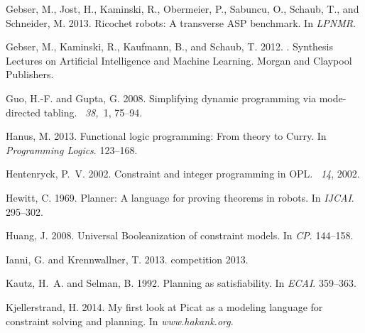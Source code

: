 \documentclass{new_tlp}
\begin{document}
\begin{thebibliography}{}
{\sc Gebser, M.}, {\sc Jost, H.}, {\sc Kaminski, R.}, {\sc Obermeier, P.}, {\sc
  Sabuncu, O.}, {\sc Schaub, T.}, {\sc and} {\sc Schneider, M.} 2013.
\newblock Ricochet robots: A transverse {ASP} benchmark.
\newblock In {\em LPNMR}.

{\sc Gebser, M.}, {\sc Kaminski, R.}, {\sc Kaufmann, B.}, {\sc and} {\sc
  Schaub, T.} 2012.
.
\newblock Synthesis Lectures on Artificial Intelligence and Machine Learning.
  Morgan and Claypool Publishers.

{\sc Guo, H.-F.} {\sc and} {\sc Gupta, G.} 2008.
\newblock Simplifying dynamic programming via mode-directed tabling.
~{\em 38,\/}~1, 75--94.

{\sc Hanus, M.} 2013.
\newblock Functional logic programming: From theory to {Curry}.
\newblock In {\em Programming Logics}. 123--168.

{\sc Hentenryck, P.~V.} 2002.
\newblock Constraint and integer programming in {OPL}.
~{\em 14}, 2002.

{\sc Hewitt, C.} 1969.
\newblock Planner: A language for proving theorems in robots.
\newblock In {\em IJCAI}. 295--302.

{\sc Huang, J.} 2008.
\newblock Universal {Booleanization} of constraint models.
\newblock In {\em CP}. 144--158.

{\sc Ianni, G.} {\sc and} {\sc Krennwallner, T.} 2013.
 competition 2013.

{\sc Kautz, H.~A.} {\sc and} {\sc Selman, B.} 1992.
\newblock Planning as satisfiability.
\newblock In {\em ECAI}. 359--363.

{\sc Kjellerstrand, H.} 2014.
\newblock My first look at {Picat} as a modeling language for constraint
  solving and planning.
\newblock In {\em www.hakank.org}.


\end{thebibliography}
\end{document}
